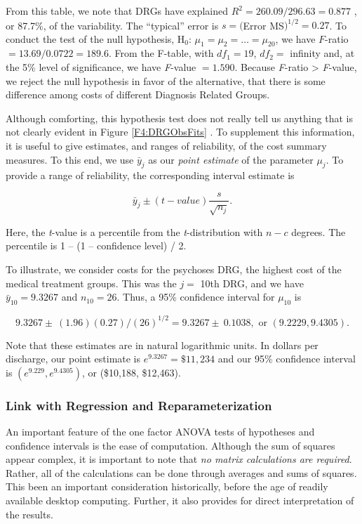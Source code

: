 \noindent From this table, we note that DRGs have explained $R^{2}=260.09/296.63=0.877$%
, or 87.7\%, of the variability. The ``typical'' error is $s=($Error MS$%
)^{1/2}=0.27$. To conduct the test of the null hypothesis, H$_0$:
$\mu _1=\mu_2=\ldots =\mu_{20}$, we have $F$-ratio
$=13.69/0.0722=189.6$. From the F-table, with $df_1=19$, $df_2=$
infinity and, at the 5\% level of significance, we have
\textit{F}-value $=1.590$. Because \textit{F}-ratio
> \textit{F}-value, we reject the null hypothesis in favor of
the alternative, that there is some difference among costs of different
Diagnosis Related Groups.

Although comforting, this hypothesis test does not really tell us
anything that is not clearly evident in Figure \ref{F4:DRGObsFits} .
To supplement this information, it is useful to give estimates, and
ranges of reliability, of the cost summary measures. To this end, we
use $\bar{y}_{j}$ as our \textit{point estimate} of the parameter
$\mu_{j}$. To provide a range of reliability, the corresponding
interval estimate is

\begin{equation*}
\bar{y}_{j}\pm (t-value)\frac{s}{\sqrt{n_{j}}}.
\end{equation*}

\noindent Here, the \textit{t}-value is a percentile from the
\textit{t}-distribution with $n-c$ degrees. The percentile is 1 --
(1 -- confidence level) / 2.

To illustrate, we consider costs for the psychoses DRG, the highest cost of
the medical treatment groups. This was the $j=$ 10th DRG, and we have $\bar{y%
}_{10}=9.3267$ and $n_{10}=26$. Thus, a 95\% confidence interval for $\mu
_{10}$ is

\begin{equation*}
9.3267\pm \ (1.96)(0.27)/(26)^{1/2}=9.3267\pm \ 0.1038,\text{ or }%
(9.2229,9.4305).
\end{equation*}

Note that these estimates are in natural logarithmic units. In dollars per
discharge, our point estimate is $e^{9.3267}=\$11,234$ and our 95\%
confidence interval is $(e^{9.229},e^{9.4305})$, or (\$10,188, \$12,463).

\subsubsection*{Link with Regression and Reparameterization}

An important feature of the one factor ANOVA tests of hypotheses and
confidence intervals is the ease of computation. Although the sum of
squares appear complex, it is important to note that \emph{no matrix
calculations are required}. Rather, all of the calculations can be
done through averages and sums of squares. This been an important
consideration historically, before the age of readily available
desktop computing. Further, it also provides for direct
interpretation of the results.

